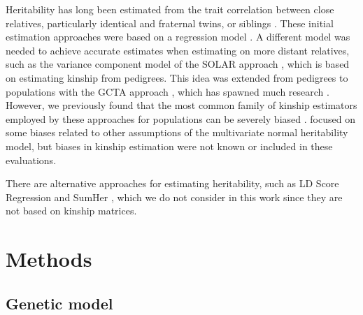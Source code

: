 \documentclass[11pt]{article}
\begin{document}
Heritability has long been estimated from the trait correlation between close relatives, particularly identical and fraternal twins, or siblings \citep{falconer_introduction_1996}.
These initial estimation approaches were based on a regression model \citep{falconer_introduction_1996}.
A different model was needed to achieve accurate estimates when estimating on more distant relatives, such as the variance component model of the SOLAR approach \citep{almasy_multipoint_1998}, which is based on estimating kinship from pedigrees.
This idea was extended from pedigrees to populations with the GCTA approach \citep{yang_common_2010, yang_gcta:_2011}, which has spawned much research \citep{visscher_commentary_2010, speed_improved_2012, krishna_kumar_limitations_2016, yang_gcta-greml_2016, jiang_high-dimensional_2016}.
However, we previously found that the most common family of kinship estimators employed by these approaches for populations can be severely biased \citep{ochoa_estimating_2021}.
\citet{speed_improved_2012} focused on some biases related to other assumptions of the multivariate normal heritability model, but biases in kinship estimation were not known or included in these evaluations.

There are alternative approaches for estimating heritability, such as LD Score Regression \citep{bulik-sullivan_ld_2015} and SumHer \citep{speed_sumher_2019}, which we do not consider in this work since they are not based on kinship matrices.


\section{Methods}

\subsection{Genetic model}
\end{document}
